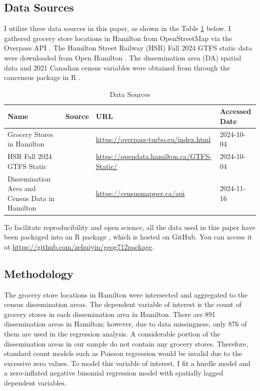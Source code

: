 \documentclass[preprint, 3p,
authoryear]{elsarticle} %
\begin{document}
\subsection{Data Sources}\label{data-sources}

I utilize three data sources in this paper, as shown in the Table
\ref{tab:data_source} below. I gathered grocery store locations in
Hamilton from OpenStreetMap \citep{osm} via the Overpass API
\citep{overpass}. The Hamilton Street Railway (HSR) Fall 2024 GTFS
static data were downloaded from Open Hamilton \citep{hsr_gtfs}. The
dissemination area (DA) spatial data and 2021 Canadian census variables
were obtained from \citet{census} through the cancensus package in R
\citep{cancensus}.

\begin{table}[h]
\centering
\begin{footnotesize}
\begin{tabularx}{\textwidth}{XXll}
\hline
Name                                           & Source              & URL                                             & Accessed Date \\
\hline
Grocery Stores in Hamilton                     & \cite{osm}          & \url{https://overpass-turbo.eu/index.html}      & 2024-10-04    \\
HSR Fall 2024 GTFS Static                      & \cite{hsr_gtfs}     & \url{https://opendata.hamilton.ca/GTFS-Static/} & 2024-10-04    \\
Dissemination Area and Census Data in Hamilton & \cite{census}       & \url{https://censusmapper.ca/api}               & 2024-11-16    \\
\hline
\end{tabularx}
\caption{\label{tab:data_source}Data Sources}
\end{footnotesize}
\end{table}

To facilitate reproducibility and open science, all the data used in
this paper have been packaged into an R package \citep{geog712package},
which is hosted on GitHub. You can access it at
\url{https://github.com/zehuiyin/geog712package}.

\subsection{Methodology}\label{methodology}

The grocery store locations in Hamilton were intersected and aggregated
to the census dissemination areas. The dependent variable of interest is
the count of grocery stores in each dissemination area in Hamilton.
There are 891 dissemination areas in Hamilton; however, due to data
missingness, only 876 of them are used in the regression analysis. A
considerable portion of the dissemination areas in our sample do not
contain any grocery stores. Therefore, standard count models such as
Poisson regression would be invalid due to the excessive zero values. To
model this variable of interest, I fit a hurdle model and a
zero-inflated negative binomial regression model with spatially lagged
dependent variables.
\end{document}
